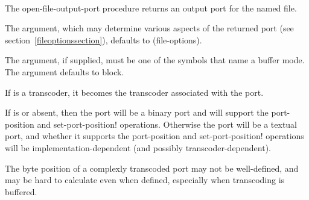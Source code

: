 \begin{entry}{%
\\
}


The {\cf open-file-output-port} procedure returns an output port for the named file.

The  argument, which may determine
various aspects of the returned port (see section~\ref{fileoptionssection}),
defaults to {\cf (file-options)}.

The  argument, if supplied,
must be one of the symbols that name a buffer mode.
The  argument defaults to {\cf block}.

If  is a transcoder, it becomes the transcoder
associated with the port.

If  is \schfalse{} or absent,
then the port will be a binary port and will support the
{\cf port-position} and {\cf set-port-position!}  operations.
Otherwise the port will be a textual port, and whether it supports
the {\cf port-position} and {\cf set-port-position!} operations
will be implementation-dependent (and possibly transcoder-dependent).

\begin{rationale}
  The byte position of a complexly transcoded port may not be
  well-defined, and may be hard to calculate even when defined,
  especially when transcoding is buffered.
\end{rationale}
\end{entry}   

